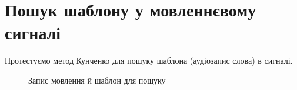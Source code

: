 \section{Пошук шаблону у мовленнєвому сигналі}
Протестуємо метод Кунченко для пошуку шаблона (аудіозапис слова) в сигналі.
\begin{figure}[!h]
    \centering

    \caption{Запис мовлення й шаблон для пошуку}\label{fig:audio}
\end{figure}

